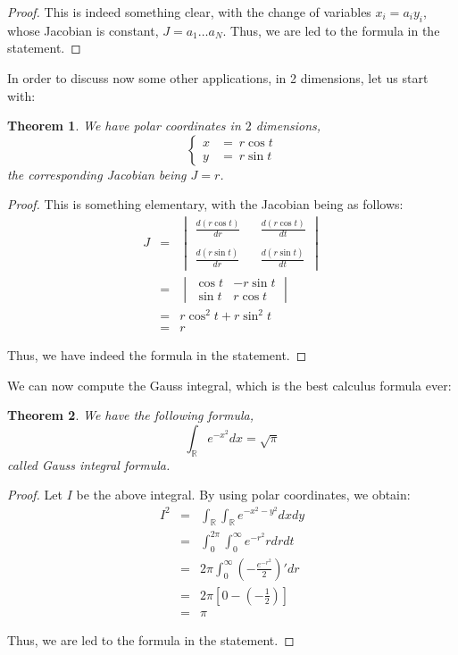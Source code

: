 \documentclass[12pt]{amsbook}
\newtheorem{theorem}{Theorem}[chapter]
\begin{document}
\begin{proof}
This is indeed something clear, with the change of variables $x_i=a_iy_i$, whose Jacobian is constant, $J=a_1\ldots a_N$. Thus, we are led to the formula in the statement.
\end{proof}

In order to discuss now some other applications, in 2 dimensions, let us start with:


\begin{theorem}
We have polar coordinates in $2$ dimensions,
$$\begin{cases}
x\!\!\!&=\ r\cos t\\
y\!\!\!&=\ r\sin t
\end{cases}$$
the corresponding Jacobian being $J=r$.
\end{theorem}

\begin{proof}
This is something elementary, with the Jacobian being as follows:
\begin{eqnarray*}
J
&=&\begin{vmatrix}
\frac{d(r\cos t)}{dr}&&\frac{d(r\cos t)}{dt}\\
\\
\frac{d(r\sin t)}{dr}&&\frac{d(r\sin t)}{dt}
\end{vmatrix}\\
&=&\begin{vmatrix}
\cos t&-r\sin t\\
\sin t&r\cos t
\end{vmatrix}\\
&=&r\cos^2t+r\sin^2t\\
&=&r
\end{eqnarray*}

Thus, we have indeed the formula in the statement.
\end{proof}

We can now compute the Gauss integral, which is the best calculus formula ever:


\begin{theorem}
We have the following formula,
$$\int_\mathbb Re^{-x^2}dx=\sqrt{\pi}$$
called Gauss integral formula.
\end{theorem}

\begin{proof}
Let $I$ be the above integral. By using polar coordinates, we obtain:
\begin{eqnarray*}
I^2
&=&\int_\mathbb R\int_\mathbb Re^{-x^2-y^2}dxdy\\
&=&\int_0^{2\pi}\int_0^\infty e^{-r^2}rdrdt\\
&=&2\pi\int_0^\infty\left(-\frac{e^{-r^2}}{2}\right)'dr\\
&=&2\pi\left[0-\left(-\frac{1}{2}\right)\right]\\
&=&\pi
\end{eqnarray*}

Thus, we are led to the formula in the statement.
\end{proof}
\end{document}
